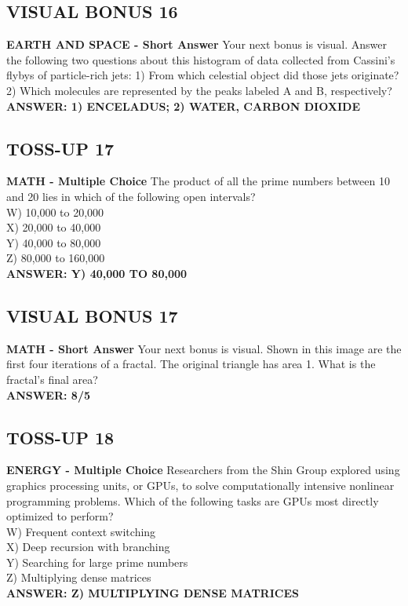 \documentclass{article}
\begin{document}
\subsection*{VISUAL BONUS 16}
\textbf{EARTH AND SPACE - Short Answer} Your next bonus is visual. Answer the following two questions about this histogram of data collected from Cassini's flybys of particle-rich jets:
1) From which celestial object did those jets originate?
2) Which molecules are represented by the peaks labeled A and B, respectively? \\
\textbf{ANSWER: 1) ENCELADUS; 2) WATER, CARBON DIOXIDE}

\subsection*{TOSS-UP 17}
\textbf{MATH - Multiple Choice} The product of all the prime numbers between 10 and 20 lies in which of the following open intervals? \\
W) 10,000 to 20,000 \\
X) 20,000 to 40,000 \\
Y) 40,000 to 80,000 \\
Z) 80,000 to 160,000 \\
\textbf{ANSWER: Y) 40,000 TO 80,000}

\subsection*{VISUAL BONUS 17}
\textbf{MATH - Short Answer} Your next bonus is visual. Shown in this image are the first four iterations of a fractal. The original triangle has area 1. What is the fractal's final area? \\
\textbf{ANSWER: 8/5}

\subsection*{TOSS-UP 18}
\textbf{ENERGY - Multiple Choice} Researchers from the Shin Group explored using graphics processing units, or GPUs, to solve computationally intensive nonlinear programming problems. Which of the following tasks are GPUs most directly optimized to perform? \\
W) Frequent context switching \\
X) Deep recursion with branching \\
Y) Searching for large prime numbers \\
Z) Multiplying dense matrices \\
\textbf{ANSWER: Z) MULTIPLYING DENSE MATRICES}
\end{document}
